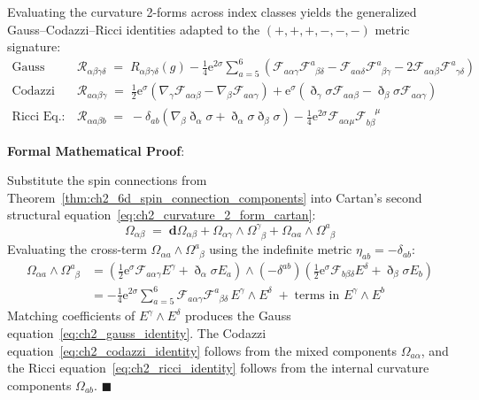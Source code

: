 \documentclass[
    12pt,
    a4paper,
    headings=normal,
    twoside=false,
    open=any,
    parskip=half
]{scrbook}
\newcommand{\ethop}{\eth}
\newcommand{\eu}{\mathrm{e}}
\newenvironment{myproof}[1][]{%
  \par\vspace{6pt}\noindent\textbf{\sffamily\color{maincolor}Formal Mathematical Proof\ifstrempty{#1}{}{ (#1)}}:\par\nopagebreak
}{%
  \penalty50\hfill\ensuremath{\blacksquare}\par\vspace{6pt}
}
\begin{document}
\begin{phystheorem}\label{thm:ch2_gauss_codazzi_identities}
Evaluating the curvature 2-forms across index classes yields the generalized Gauss--Codazzi--Ricci identities adapted to the $(+,+,+,-,-,-)$ metric signature:
\begin{align}
\text{Gauss Eq.:} \quad &\mathcal{R}_{\alpha\beta\gamma\delta} \;=\; R_{\alpha\beta\gamma\delta}(g) - \frac{1}{4} \eu^{2\sigma} \sum_{a=5}^6 \left( \mathcal{F}_{a\alpha\gamma} \mathcal{F}^a_{\phantom{a}\beta\delta} - \mathcal{F}_{a\alpha\delta} \mathcal{F}^a_{\phantom{a}\beta\gamma} - 2 \mathcal{F}_{a\alpha\beta} \mathcal{F}^a_{\phantom{a}\gamma\delta} \right) \label{eq:ch2_gauss_identity} \\
\text{Codazzi Eq.:} \quad &\mathcal{R}_{a\alpha\beta\gamma} \;=\; \frac{1}{2} \eu^\sigma \left( \nabla_\gamma \mathcal{F}_{a\alpha\beta} - \nabla_\beta \mathcal{F}_{a\alpha\gamma} \right) + \eu^\sigma \left( \ethop_\gamma\sigma \mathcal{F}_{a\alpha\beta} - \ethop_\beta\sigma \mathcal{F}_{a\alpha\gamma} \right) \label{eq:ch2_codazzi_identity} \\
\text{Ricci Eq.:} \quad &\mathcal{R}_{\alpha a\beta b} \;=\; -\delta_{ab} \left( \nabla_\beta \ethop_\alpha \sigma + \ethop_\alpha \sigma \ethop_\beta \sigma \right) - \frac{1}{4} \eu^{2\sigma} \mathcal{F}_{a\alpha\mu} \mathcal{F}_{b\beta}^{\phantom{b\beta}\mu} \label{eq:ch2_ricci_identity}
\end{align}
\end{phystheorem}

\begin{myproof}
Substitute the spin connections from Theorem~\ref{thm:ch2_6d_spin_connection_components} into Cartan's second structural equation~\eqref{eq:ch2_curvature_2_form_cartan}:
\begin{equation*}
\Omega_{\alpha\beta} \;=\; \mathbf{d} \Omega_{\alpha\beta} + \Omega_{\alpha\gamma} \wedge \Omega^\gamma_{\phantom{\gamma}\beta} + \Omega_{\alpha a} \wedge \Omega^a_{\phantom{a}\beta}
\end{equation*}
Evaluating the cross-term $\Omega_{\alpha a} \wedge \Omega^a_{\phantom{a}\beta}$ using the indefinite metric $\eta_{ab} = -\delta_{ab}$:
\begin{align*}
\Omega_{\alpha a} \wedge \Omega^a_{\phantom{a}\beta} &= \left( \frac{1}{2}\eu^\sigma \mathcal{F}_{a\alpha\gamma} E^\gamma + \ethop_\alpha\sigma E_a \right) \wedge \left( -\delta^{ab} \right) \left( \frac{1}{2}\eu^\sigma \mathcal{F}_{b\beta\delta} E^\delta + \ethop_\beta\sigma E_b \right) \\
&= -\frac{1}{4} \eu^{2\sigma} \sum_{a=5}^6 \mathcal{F}_{a\alpha\gamma} \mathcal{F}^a_{\phantom{a}\beta\delta} \, E^\gamma \wedge E^\delta \;+\; \text{terms in } E^\gamma \wedge E^b
\end{align*}
Matching coefficients of $E^\gamma \wedge E^\delta$ produces the Gauss equation~\eqref{eq:ch2_gauss_identity}. The Codazzi equation~\eqref{eq:ch2_codazzi_identity} follows from the mixed components $\Omega_{a\alpha}$, and the Ricci equation~\eqref{eq:ch2_ricci_identity} follows from the internal curvature components $\Omega_{ab}$.
\end{myproof}
\end{document}
